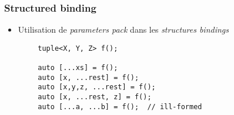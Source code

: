 \documentclass[C++.tex]{subfiles}
\begin{document}
\begin{frame}[fragile]
	\frametitle{Structured binding}
	\begin{itemize}
		\item Utilisation de \textit{parameters pack} dans les \textit{structures bindings}
	\end{itemize}

	\begin{verbatim}
		tuple<X, Y, Z> f();

		auto [...xs] = f();
		auto [x, ...rest] = f();
		auto [x,y,z, ...rest] = f();
		auto [x, ...rest, z] = f();
		auto [...a, ...b] = f();  // ill-formed
	\end{verbatim}

\end{frame}
\end{document}
